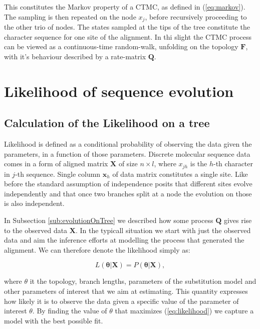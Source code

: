 \documentclass[12pt,twoside]{mitthesis}
\theoremstyle{plain}
\theoremstyle{definition}
\theoremstyle{remark}
\begin{document}
This constitutes the Markov property of a CTMC, as defined in (\ref{eq:markov}).
The sampling is then repeated on the node $x_j$, before recursively proceeding to the other trio of nodes.
The states sampled at the tips of the tree constitute the character sequence for one site of the alignment.
In thi slight the CTMC process can be viewed as a continuous-time random-walk, unfolding on the topology $\mathbf{F}$, with it's behaviour described by a rate-matrix $\mathbf{Q}$.

\section{Likelihood of sequence evolution}

\subsection{Calculation of the Likelihood on a tree\label{sub:likelihood}}

Likelihood is defined as a conditional probability of observing the data given the parameters, in a function of those parameters.
Discrete molecular sequence data comes in a form of aligned matrix $\mathbf{X}$ of size $n \times l$, where $x_{jh}$ is the $h$-th character in $j$-th sequence.
Single column $\mathbf{x}_{h}$ of data matrix constitutes a single site.
Like before the standard assumption of independence posits that different sites evolve independently and that once two branches split at a node the evolution on those is also independent.

In Subsection \ref{sub:evolutionOnTree} we described how some process $\mathbf{Q}$ gives rise to the observed data $\mathbf{X}$.
In the typicall situation we start with just the observed data and aim the inference efforts at modelling the process that generated the alignment.
We can therefore denote the likelihood simply as: 

\begin{equation}
L\left(\mathbf{\theta}|\mathbf{X}\right)=P\left(\mathbf{\theta}|\mathbf{X}\right), 
\label{eq:likelihood}
\end{equation}

\noindent
where $\theta$ it the topology, branch lengths, parameters of the substitution model and other parameters of interest that we aim at estimating.
This quantity expresses how likely it is to observe the data given a specific value of the parameter of interest $\theta$.
By finding the value of $\theta$ that maximizes (\ref{eq:likelihood}) we capture a model with the best possible fit.
\end{document}
